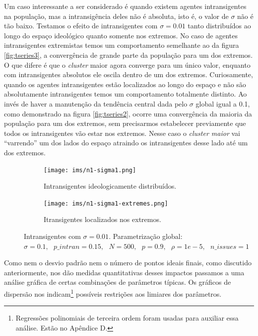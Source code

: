   Um caso interessante a ser considerado é quando existem agentes intransigentes
  na população, mas a intransigência deles não é absoluta, isto é, o valor de
  \(\sigma\) não é tão baixo. Testamos o efeito de intransigentes com \(\sigma = 0.01\)
  tanto distribuídos ao longo do espaço ideológico quanto somente nos extremos.
  No caso de agentes intransigentes extremistas temos um comportamento
  semelhante ao da figura \ref{fig:tseries3}, a convergência de grande parte da
  população para um dos extremos. O que difere é que o \textit{cluster} maior
  agora converge para um único valor, enquanto com intransigentes absolutos ele
  oscila dentro de um dos extremos. Curiosamente, quando os agentes
  intransigentes estão localizados ao longo do espaço e não são absolutamente
  intransigentes temos um comportamento totalmente distinto. Ao invés de haver a
  manutenção da tendência central dada pelo \(\sigma\) global igual a 0.1, como
  demonstrado na figura \ref{fig:tseries2}, ocorre uma convergência da maioria
  da população para um dos extremos, sem precisarmos estabelecer previamente que
  todos os intransigentes vão estar nos extremos. Nesse caso o \textit{cluster
    maior} vai ``varrendo'' um dos lados do espaço atraindo os intransigentes desse
  lado até um dos extremos.

  \begin{figure}[H]
    \centering
    \begin{subfigure}[b]{0.49\textwidth}
      \texttt{[image: ims/n1-sigma1.png]}
      \caption{Intransigentes ideologicamente distribuídos.}
    \end{subfigure}
    \begin{subfigure}[b]{0.49\textwidth}
      \texttt{[image: ims/n1-sigma1-extremes.png]}
       \caption{Itransigentes localizados nos extremos.}
     \end{subfigure}

     \caption{ Intransigentes com \(\sigma = 0.01\). Parametrização global: \( \sigma =
       0.1, \text{ } p\_intran = 0.15, \text{ } N = 500, \text{ } p = 0.9,
       \text{ } \rho = 1e-5, \text{ } n\_issues = 1 \)}
    \label{fig:newintrans}
     \end{figure}
  

    Como nem o desvio padrão nem o número de pontos ideais finais,
    como discutido anteriormente, nos dão medidas quantitativas desses impactos
    passamos a uma análise gráfica de certas combinações de parâmetros típicas.
    Os gráficos de dispersão nos indicam\footnote{Regressões polinomiais de
      terceira ordem foram usadas para auxiliar essa análise. Estão no
      Apêndice D.} possíveis restrições aos limiares dos parâmetros.

